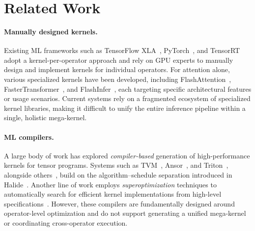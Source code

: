 \section{Related Work}
\label{sec:related}

\paragraph{Manually designed kernels.}
Existing ML frameworks such as TensorFlow XLA~\cite{tensorflow_xla, Tensorflow}, PyTorch~\cite{pytorch}, and TensorRT~\cite{tensorrt} adopt a kernel-per-operator approach and rely on GPU experts to manually design and implement kernels for individual operators.
For attention alone, various specialized kernels have been developed, including FlashAttention~\cite{dao2023flash, tri2023flashdecoding, hong2024flashdecoding}, FasterTransformer~\cite{fastertransformer}, and FlashInfer~\cite{ye2025flashinfer}, each targeting specific architectural features or usage scenarios. Current systems rely on a fragmented ecosystem of specialized kernel libraries, making it difficult to unify the entire inference pipeline within a single, holistic mega-kernel.

%

\paragraph{ML compilers.}
A large body of work has explored {\em compiler-based} generation of high-performance kernels for tensor programs. Systems such as TVM~\cite{tvm, tvm_auto_tuner}, Ansor~\cite{ansor}, and Triton~\cite{tillet2019triton}, alongside others~\cite{zheng2020flextensor, hagedorn2023graphene, feng2022tensorir, hu2024korch}, build on the algorithm–schedule separation introduced in Halide~\cite{halide, autohalide}.
Another line of work employs {\em superoptimization} techniques to automatically search for efficient kernel implementations from high-level specifications~\cite{TASO, wang2021pet, zheng2023einnet, tensat, unger2022unity}.
However, these compilers are fundamentally designed around operator-level optimization and do not support generating a unified mega-kernel or coordinating cross-operator execution.

